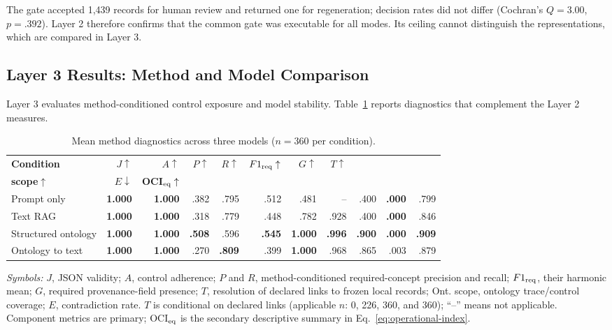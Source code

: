 \documentclass[runningheads]{llncs}
\begin{document}
The gate accepted 1,439 records for human review and returned one for
regeneration; decision rates did not differ (Cochran's $Q=3.00$, $p=.392$).
Layer 2 therefore confirms that the common gate was executable for all modes. Its
ceiling cannot distinguish the representations, which are compared in Layer 3.

\subsection{Layer 3 Results: Method and Model Comparison}

Layer 3 evaluates method-conditioned control exposure and model stability.
Table~\ref{tab:method} reports diagnostics that complement the Layer 2 measures.

\begin{table}[!h]
\caption{Mean method diagnostics across three models ($n=360$ per condition).}
\label{tab:method}
\centering
\fontsize{6.25}{6.9}\selectfont
\setlength{\tabcolsep}{1.05pt}
\begin{tabular}{@{}>{\raggedright\arraybackslash}p{1.72cm}rrrrrrrrrr@{}}
\toprule
\textbf{Condition} & \textbf{$J\uparrow$} & \textbf{$A\uparrow$} &
\textbf{$P\uparrow$} & \textbf{$R\uparrow$} & \textbf{$F1_{\rm req}\uparrow$} &
\textbf{$G\uparrow$} & \textbf{$T\uparrow$} &
\shortstack{\textbf{Ont.}\\\textbf{scope}$\uparrow$} &
\textbf{$E\downarrow$} & \textbf{OCI$_{\rm eq}\uparrow$}\\
\midrule
Prompt only            & \textbf{1.000} & \textbf{1.000} & .382 & .795 & .512 & .481 & -- & .400 & \textbf{.000} & .799\\
Text RAG               & \textbf{1.000} & \textbf{1.000} & .318 & .779 & .448 & .782 & .928 & .400 & \textbf{.000} & .846\\
Structured ontology    & \textbf{1.000} & \textbf{1.000} & \textbf{.508} & .596 & \textbf{.545} & \textbf{1.000} & \textbf{.996} & \textbf{.900} & \textbf{.000} & \textbf{.909}\\
Ontology to text       & \textbf{1.000} & \textbf{1.000} & .270 & \textbf{.809} & .399 & \textbf{1.000} & .968 & .865 & .003 & .879\\
\bottomrule
\end{tabular}
\par\vspace{2pt}
\begin{minipage}{0.97\textwidth}
\fontsize{7.0}{7.6}\selectfont
\emph{Symbols:} $J$, JSON validity; $A$, control adherence; $P$ and $R$, method-conditioned required-concept precision and recall; $F1_{\rm req}$, their harmonic mean; $G$, required provenance-field presence; $T$, resolution of declared links to frozen local records; Ont. scope, ontology trace/control coverage; $E$, contradiction rate. $T$ is conditional on declared links (applicable $n$: 0, 226, 360, and 360); ``--'' means not applicable. Component metrics are primary; OCI$_{\rm eq}$ is the secondary descriptive summary in Eq.~\ref{eq:operational-index}.
\end{minipage}
\end{table}
\end{document}
